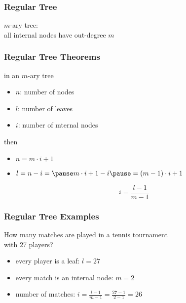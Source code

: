\documentclass[dvipsnames]{beamer}
\begin{document}
\begin{frame}
  \frametitle{Regular Tree}

  \begin{definition}
    \alert{$m$-ary tree}:\\
    all internal nodes have out-degree $m$
  \end{definition}
\end{frame}

\begin{frame}
  \frametitle{Regular Tree Theorems}

  \begin{theorem}
    in an $m$-ary tree

    \begin{itemize}
      \item $n$: number of nodes
      \item $l$: number of leaves
      \item $i$: number of ınternal nodes
    \end{itemize}

    then

    \begin{itemize}
      \item $n = m \cdot i + 1$

      \pause
      \item  $l = n - i = \pause m \cdot i + 1 - i
        \pause = (m - 1) \cdot i + 1$

      \pause
      \[
        i = \frac{l - 1}{m - 1}
      \]
    \end{itemize}
  \end{theorem}
\end{frame}

\begin{frame}
  \frametitle{Regular Tree Examples}

  \begin{example}
    How many matches are played in a tennis tournament\\
    with 27 players?

    \pause
    \bigskip
    \begin{itemize}
      \item every player is a leaf: $l = 27$
      \item every match is an internal node: $m = 2$

      \pause
      \item number of matches: $i = \frac{l - 1}{m - 1} = \frac{27 - 1}{2 - 1} = 26$
    \end{itemize}
  \end{example}
\end{frame}
\end{document}
